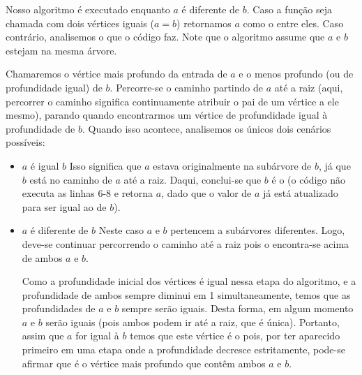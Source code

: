 
\iffalse
Nosso algoritmo é executado enquanto $a$ é diferente de $b$. Caso a função seja chamada com dois vértices iguais ($a = b$) retornamos $a$ como o \LCA entre eles. Caso contrário, analisemos o que o código faz. Note que o algoritmo assume que $a$ e $b$ estejam na mesma árvore.

Chamaremos o vértice mais profundo da entrada de $a$ e o menos profundo (ou de profundidade igual) de $b$. Percorre-se o caminho partindo de $a$ até a raiz (aqui, percorrer o caminho significa continuamente atribuir o pai de um vértice a ele mesmo), parando quando encontrarmos um vértice de profundidade igual à profundidade de $b$. Quando isso acontece, analisemos os únicos dois cenários possíveis:

\begin{itemize}
    \item $a$ é igual $b$
        \newline Isso significa que $a$ estava originalmente na subárvore de $b$, já que $b$ está no caminho de $a$ até a raiz. Daqui, conclui-se que $b$ é o \LCA (o código não executa as linhas 6-8 e retorna $a$, dado que o valor de $a$ já está atualizado para ser igual ao de $b$).
        
    \item $a$ é diferente de $b$
        \newline Neste caso $a$ e $b$ pertencem a subárvores diferentes. Logo, deve-se continuar percorrendo o caminho até a raiz pois o \LCA encontra-se acima de ambos $a$ e $b$.
        
        Como a profundidade inicial dos vértices é igual nessa etapa do algoritmo, e a profundidade de ambos sempre diminui em 1 simultaneamente, temos que as profundidades de $a$ e $b$ sempre serão iguais. Desta forma, em algum momento $a$ e $b$ serão iguais (pois ambos podem ir até a raiz, que é única). Portanto, assim que $a$ for igual à $b$ temos que este vértice é o \LCA pois, por ter aparecido primeiro em uma etapa onde a profundidade decresce estritamente, pode-se afirmar que é o vértice mais profundo que contêm ambos $a$ e $b$.
\end{itemize}
\endfalse

